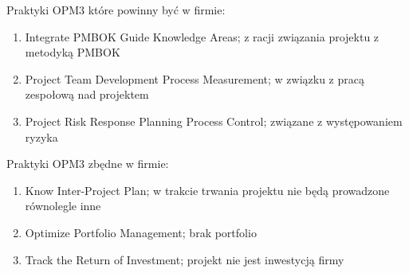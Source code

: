 Praktyki OPM3 które powinny być w firmie:
\begin{enumerate}
\item Integrate PMBOK Guide Knowledge Areas; z racji związania projektu z metodyką PMBOK
\item Project Team Development Process Measurement; w związku z pracą zespołową nad projektem
\item Project Risk Response Planning Process Control; związane z występowaniem ryzyka
\end{enumerate}
Praktyki OPM3 zbędne w firmie:
\begin{enumerate}
\item Know Inter-Project Plan; w trakcie trwania projektu nie będą prowadzone równolegle inne
\item Optimize Portfolio Management; brak portfolio
\item Track the Return of Investment; projekt nie jest inwestycją firmy
\end{enumerate}


